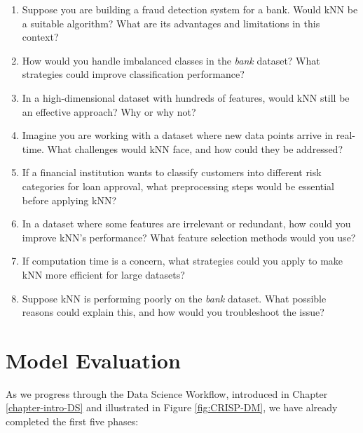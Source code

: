 \documentclass[
  11pt,
]{book}
\providecommand{\tightlist}{%
  \setlength{\itemsep}{0pt}\setlength{\parskip}{0pt}}
\theoremstyle{definition}
\theoremstyle{definition}
\theoremstyle{definition}
\theoremstyle{definition}
\theoremstyle{remark}
\begin{document}
\begin{enumerate}
\def\labelenumi{\arabic{enumi}.}
\setcounter{enumi}{26}
\tightlist
\item
  Suppose you are building a fraud detection system for a bank. Would kNN be a suitable algorithm? What are its advantages and limitations in this context?\\
\item
  How would you handle imbalanced classes in the \emph{bank} dataset? What strategies could improve classification performance?\\
\item
  In a high-dimensional dataset with hundreds of features, would kNN still be an effective approach? Why or why not?\\
\item
  Imagine you are working with a dataset where new data points arrive in real-time. What challenges would kNN face, and how could they be addressed?\\
\item
  If a financial institution wants to classify customers into different risk categories for loan approval, what preprocessing steps would be essential before applying kNN?\\
\item
  In a dataset where some features are irrelevant or redundant, how could you improve kNN's performance? What feature selection methods would you use?\\
\item
  If computation time is a concern, what strategies could you apply to make kNN more efficient for large datasets?\\
\item
  Suppose kNN is performing poorly on the \emph{bank} dataset. What possible reasons could explain this, and how would you troubleshoot the issue?
\end{enumerate}

\chapter{Model Evaluation}\label{chapter-evaluation}

As we progress through the Data Science Workflow, introduced in Chapter \ref{chapter-intro-DS} and illustrated in Figure \ref{fig:CRISP-DM}, we have already completed the first five phases:
\end{document}

